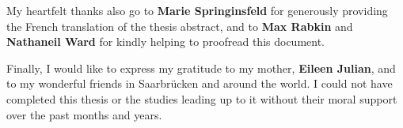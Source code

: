 My heartfelt thanks also go to \textbf{Marie Springinsfeld} for generously providing the French translation of the thesis abstract, and to \textbf{Max Rabkin} and \textbf{Nathaneil Ward} for kindly helping to proofread this document.

Finally, I would like to express my gratitude to 
my mother, \textbf{Eileen Julian}, and to {my wonderful friends} in Saarbrücken and around the world.
I could not have completed this thesis or the studies leading up to it without 
their moral support over the past months and years.
